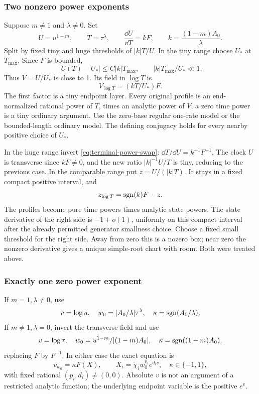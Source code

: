 \subsubsection{Two nonzero power exponents}

Suppose \(m\ne1\) and \(\lambda\ne0\).  Set
\begin{equation}\label{eq:terminal-power-swap}
 U=u^{1-m},\qquad T=\tau^\lambda,\qquad
 \frac{\dd U}{\dd T}=kF,
 \qquad k=\frac{(1-m)A_0}{\lambda}.
\end{equation}
Split by fixed tiny and huge thresholds of \(|k|T/U\).
In the tiny range choose \(U_*\) at \(T_{\max}\).  Since \(F\) is
bounded,
\[
 |U(T)-U_*|\le C|k|T_{\max},\qquad
 |k|T_{\max}/U_*\ll1.
\]
Thus \(V=U/U_*\) is close to 1.  Its field in \(\log T\) is
\[
 V_{\log T}=(kT/U_*)F.
\]
The first factor is a tiny endpoint layer.  Every original profile is an
end-normalized rational power of \(T\), times an analytic power of
\(V\); a zero time power is a tiny ordinary argument.  Use the zero-base
regular one-rate model or the bounded-length ordinary model.  The defining
conjugacy holds for every nearby positive choice of \(U_*\).

In the huge range invert \eqref{eq:terminal-power-swap}:
\(\dd T/\dd U=k^{-1}F^{-1}\).  The clock \(U\) is transverse since
\(kF\ne0\), and the new ratio \(|k|^{-1}U/T\) is tiny, reducing to the
previous case.  In the comparable range put \(z=U/(|k|T)\).  It stays in
a fixed compact positive interval, and
\begin{equation}\label{eq:terminal-comparable-power}
 z_{\log T}=\operatorname{sgn}(k)F-z.
\end{equation}
The profiles become pure time powers times analytic state powers.  The
state derivative of the right side is \(-1+o(1)\), uniformly on this
compact interval after the already permitted generator smallness choice.
Choose a fixed small threshold for the right side.  Away from zero this is
a nozero box; near zero the nonzero derivative gives a unique simple-root
chart with room.  Both were treated above.

\subsubsection{Exactly one zero power exponent}

If \(m=1,\lambda\ne0\), use
\[
 v=\log u,\quad w_0=|A_0/\lambda|\tau^\lambda,
 \quad \kappa=\operatorname{sgn}(A_0/\lambda).
\]
If \(m\ne1,\lambda=0\), invert the transverse field and use
\[
 v=\log\tau,\quad
 w_0=u^{1-m}/|(1-m)A_0|,
 \quad\kappa=\operatorname{sgn}((1-m)A_0),
\]
replacing \(F\) by \(F^{-1}\).  In either case the exact equation is
\begin{equation}\label{eq:terminal-log-power}
 v_{w_0}=\kappa F(X),\qquad
 X_i=\widetilde\chi_iw_0^{p_i}e^{d_i v},\quad\kappa\in\{-1,1\},
\end{equation}
with fixed rational \((p_i,d_i)\ne(0,0)\).
Absolute \(v\) is not an argument of a restricted analytic function;
the underlying endpoint variable is the positive \(e^v\).

